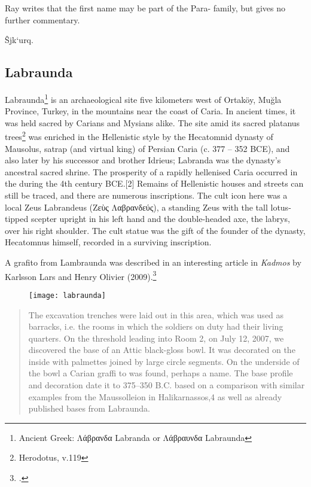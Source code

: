 Ray writes that the first name may be part of the Para- family, but gives no further commentary.



\^{S}jk`urq. 

\subsection{Labraunda}
Labraunda\footnote{Ancient Greek: Λάβρανδα Labranda or Λάβραυνδα Labraunda} is an  archaeological site five kilometers west of Ortaköy, 
Muğla Province, Turkey, in the mountains near the coast of Caria. In ancient times, it was held sacred by Carians and Mysians alike. 
The site amid its sacred platanus trees\footnote{Herodotus, v.119} was enriched in the Hellenistic style by the Hecatomnid dynasty of Mausolus, satrap (and virtual king) of Persian Caria (c. 377 – 352 BCE), and also later by his successor and brother Idrieus; Labranda was the dynasty's ancestral sacred shrine. The prosperity of a rapidly hellenised Caria occurred in the during the 4th century BCE.[2] Remains of Hellenistic houses and streets can still be traced, and there are numerous inscriptions. The cult icon here was a local Zeus Labrandeus (Ζεὺς Λαβρανδεύς), a standing Zeus with the tall lotus-tipped scepter upright in his left hand and the double-headed axe, the labrys, over his right shoulder. The cult statue was the gift of the founder of the dynasty, Hecatomnus himself, recorded in a surviving inscription.

A grafito from Lambraunda was described in an interesting article in \textit{Kadmos} by Karlsson Lars and Henry Olivier (2009).\footcite{Karlsson2009}

\begin{figure}[htbp]
 \texttt{[image: labraunda]}
 \end{figure}

\begin{quotation}
 The excavation trenches were laid out in this area, which was used as barracks, i.e.
the rooms in which the soldiers on duty had their living quarters. On
the threshold leading into Room 2, on July 12, 2007, we discovered
the base of an Attic black-gloss bowl. It was decorated on the inside
with palmettes joined by large circle segments. On the underside of the
bowl a Carian graffi to was found, perhaps a name. The base profile
and decoration date it to 375--350 B.C. based on a comparison with
similar examples from the Maussolleion in Halikarnassos,4
 as well
 as already published bases from Labraunda.
 \end{quotation}

